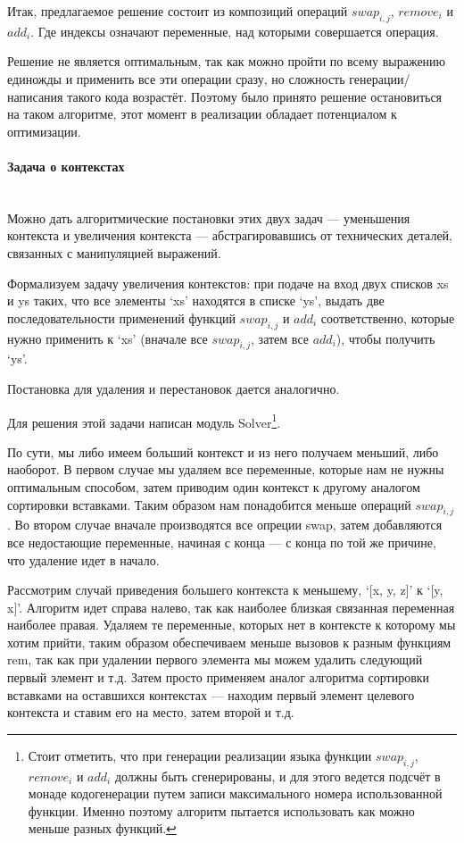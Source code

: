 \hfill

Итак, предлагаемое решение состоит из композиций операций $swap_{i,j}$, $remove_i$ и $add_i$. Где индексы означают переменные, над которыми совершается операция.

Решение не является оптимальным, так как можно пройти по всему выражению единожды и применить все эти операции сразу, но сложность генерации/написания такого кода возрастёт. Поэтому было принято решение остановиться на таком алгоритме, этот момент в реализации обладает потенциалом к оптимизации.

\paragraph{Задача о контекстах} \hspace{0pt} \\

Можно дать алгоритмические постановки этих двух задач --- уменьшения контекста и увеличения контекста --- абстрагировавшись от технических деталей, связанных с манипуляцией выражений.

Формализуем задачу увеличения контекстов: при подаче на вход двух списков xs и ys таких, что все элементы `xs' находятся в списке `ys', выдать две последовательности применений функций $swap_{i,j}$ и $add_i$ соответственно, которые нужно применить к `xs' (вначале все $swap_{i,j}$, затем все $add_i$), чтобы получить `ys'.

Постановка для удаления и перестановок дается аналогично.

Для решения этой задачи написан модуль Solver\footnote{Стоит отметить, что при генерации реализации языка функции $swap_{i,j}$, $remove_i$ и $add_i$ должны быть сгенерированы, и для этого ведется подсчёт в монаде кодогенерации путем записи максимального номера использованной функции. Именно поэтому алгоритм пытается использовать как можно меньше разных функций.}.

По сути, мы либо имеем больший контекст и из него получаем меньший, либо наоборот. В первом случае мы удаляем все переменные, которые нам не нужны оптимальным способом, затем приводим один контекст к другому аналогом сортировки вставками. Таким образом нам понадобится меньше операций $swap_{i,j}$. Во втором случае вначале производятся все опреции swap, затем добавляются все недостающие переменные, начиная с конца --- с конца по той же причине, что удаление идет в начало.

Рассмотрим случай приведения большего контекста к меньшему, `[x, y, z]' к `[y, x]'. Алгоритм идет справа налево, так как наиболее близкая связанная переменная наиболее правая. Удаляем те переменные, которых нет в контексте к которому мы хотим прийти, таким образом обеспечиваем меньше вызовов к разным функциям rem, так как при удалении первого элемента мы можем удалить следующий первый элемент и т.д. Затем просто применяем аналог алгоритма сортировки вставками на оставшихся контекстах --- находим первый элемент целевого контекста и ставим его на место, затем второй и т.д.

